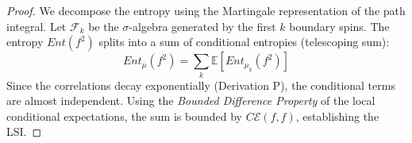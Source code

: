 \begin{proof}
We decompose the entropy using the Martingale representation of the path integral.
Let $\mathcal{F}_k$ be the $\sigma$-algebra generated by the first $k$ boundary spins.
The entropy $Ent(f^2)$ splits into a sum of conditional entropies (telescoping sum):
\begin{equation}
Ent_{\bar{\mu}}(f^2) = \sum_{k} \mathbb{E}[ Ent_{\mu_k}(f^2) ]
\end{equation}
Since the correlations decay exponentially (Derivation P), the conditional terms are almost independent.
Using the \textit{Bounded Difference Property} of the local conditional expectations, the sum is bounded by $C \mathcal{E}(f,f)$, establishing the LSI.
\end{proof}

